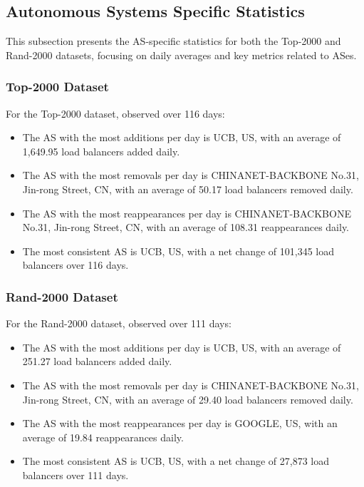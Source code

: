 \documentclass[12pt]{cwru_thesis}
\begin{document}
\newpage

\subsection{Autonomous Systems Specific Statistics}

This subsection presents the AS-specific statistics for both the Top-2000 and Rand-2000 datasets, focusing on daily averages and key metrics related to ASes.

\subsubsection{Top-2000 Dataset}

For the Top-2000 dataset, observed over 116 days:

\begin{itemize}
    \item The AS with the most additions per day is UCB, US, with an average of 1,649.95 load balancers added daily.
    \item The AS with the most removals per day is CHINANET-BACKBONE No.31, Jin-rong Street, CN, with an average of 50.17 load balancers removed daily.
    \item The AS with the most reappearances per day is CHINANET-BACKBONE No.31, Jin-rong Street, CN, with an average of 108.31 reappearances daily.
    \item The most consistent AS is UCB, US, with a net change of 101,345 load balancers over 116 days.
\end{itemize}

\subsubsection{Rand-2000 Dataset}

For the Rand-2000 dataset, observed over 111 days:

\begin{itemize}
    \item The AS with the most additions per day is UCB, US, with an average of 251.27 load balancers added daily.
    \item The AS with the most removals per day is CHINANET-BACKBONE No.31, Jin-rong Street, CN, with an average of 29.40 load balancers removed daily.
    \item The AS with the most reappearances per day is GOOGLE, US, with an average of 19.84 reappearances daily.
    \item The most consistent AS is UCB, US, with a net change of 27,873 load balancers over 111 days.

\end{itemize}
\end{document}
